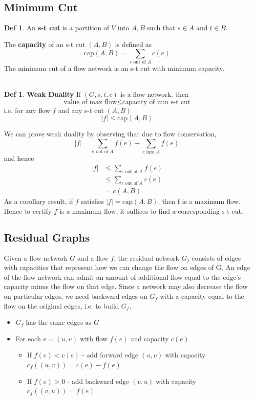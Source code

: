 \documentclass{article}
\theoremstyle{plain}
\theoremstyle{definition}
\newtheorem{defn}[dummy]{Def}
\begin{document}
    \subsection{Minimum Cut}
        \begin{defn}
            An \textbf{s-t cut} is a partition of $V$ into $A, B$ such that $s \in A$ and $t \in B$. 
        \end{defn}
        The \textbf{capacity} of an s-t cut $(A,B)$ is defined as 
        \[ \text{cap}(A,B) = \sum_{e \text{ out of } A} c(e) \]
        The minimum cut of a flow network is an s-t cut with minimum capacity. \\ \\
        \begin{defn}
            \textbf{Weak Duality} If $(G, s, t, c)$ is a flow network, then
            \[ \text{value of max flow} \leq \text{capacity of min s-t cut} \]
            i.e. for any flow $f$ and any s-t cut $(A, B)$
            \[ |f| \leq \text{cap}(A,B) \]
        \end{defn}
        \noindent We can prove weak duality by observing that due to flow conservation, 
        \[ |f| = \sum_{e \text{ out of } A} f(e) -  \sum_{e \text{ into } A} f(e)\]
        and hence
        \begin{align*}
            |f| &\leq  \sum_{e \text{ out of } A} f(e) \\  
            &\leq  \sum_{e \text{ out of } A} c(e)
            \\ &= c(A,B)
        \end{align*}
        As a corollary result, if $f$ satisfies $|f| = \text{cap}(A,B)$, then f is a maximum flow. Hence to certify $f$ is a maximum flow, it suffices to find a corresponding s-t cut. 
        \subsection{Residual Graphs}

        Given a flow network $G$ and a flow $f$, the residual network $G_f$ consists of edges with capacities that represent how we can change the flow on edges of G. An edge of the flow network can admit an amount of additional flow equal to the edge's capacity minus the flow on that edge. Since a network may also decrease the flow on particular edges, we need backward edges on $G_f$ with a capacity equal to the flow on the original edges, i.e. to build $G_f$,
        \begin{itemize}
            \item $G_f$ has the same edges as $G$
            \item For each $e = (u,v)$ with flow $f(e)$ and capacity $c(e)$
            \begin{itemize}
                \item If $f(e) < c(e)$ - add forward edge $(u,v)$ with capacity $c_f((u,v)) = c(e) - f(e)$
                \item If $f(e) > 0$ - add backward edge $(v,u)$ with capacity $c_f((v,u)) = f(e)$
            \end{itemize}
        \end{itemize}
\end{document}
